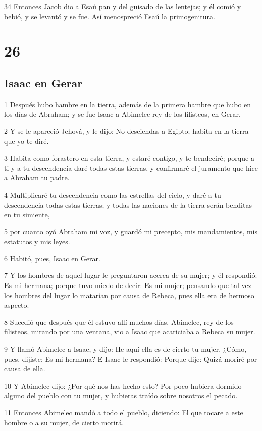 34 Entonces Jacob dio a Esaú pan y del guisado de las lentejas; y él comió y bebió, y se levantó y se fue. Así menospreció Esaú la primogenitura.

\chapter{26}

\section{Isaac en Gerar}

1 Después hubo hambre en la tierra, además de la primera hambre que hubo en los días de Abraham; y se fue Isaac a Abimelec rey de los filisteos, en Gerar.

2 Y se le apareció Jehová, y le dijo: No desciendas a Egipto; habita en la tierra que yo te diré.

3 Habita como forastero en esta tierra, y estaré contigo, y te bendeciré; porque a ti y a tu descendencia daré todas estas tierras, y confirmaré el juramento que hice a Abraham tu padre.

4 Multiplicaré tu descendencia como las estrellas del cielo, y daré a tu descendencia todas estas tierras; y todas las naciones de la tierra serán benditas en tu simiente,

5 por cuanto oyó Abraham mi voz, y guardó mi precepto, mis mandamientos, mis estatutos y mis leyes.

6 Habitó, pues, Isaac en Gerar.

7 Y los hombres de aquel lugar le preguntaron acerca de su mujer; y él respondió: Es mi hermana; porque tuvo miedo de decir: Es mi mujer; pensando que tal vez los hombres del lugar lo matarían por causa de Rebeca, pues ella era de hermoso aspecto.

8 Sucedió que después que él estuvo allí muchos días, Abimelec, rey de los filisteos, mirando por una ventana, vio a Isaac que acariciaba a Rebeca su mujer.

9 Y llamó Abimelec a Isaac, y dijo: He aquí ella es de cierto tu mujer. ¿Cómo, pues, dijiste: Es mi hermana? E Isaac le respondió: Porque dije: Quizá moriré por causa de ella.

10 Y Abimelec dijo: ¿Por qué nos has hecho esto? Por poco hubiera dormido alguno del pueblo con tu mujer, y hubieras traído sobre nosotros el pecado.

11 Entonces Abimelec mandó a todo el pueblo, diciendo: El que tocare a este hombre o a su mujer, de cierto morirá.

